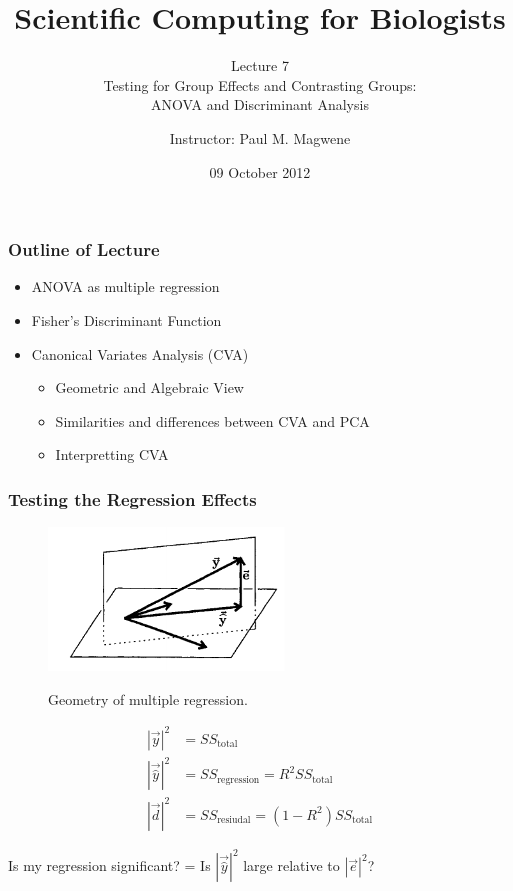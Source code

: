 \documentclass{beamer}
\title{Scientific Computing for Biologists}
\subtitle{Lecture 7 \\
        Testing for Group Effects and Contrasting Groups:\\ 
         ANOVA and Discriminant Analysis}
\author{Instructor: Paul M. Magwene}
\date{09 October 2012}
\begin{document}
\begin{frame}
\titlepage
\end{frame}


\begin{frame}
  \frametitle{Outline of Lecture}

\begin{itemize}
    \item ANOVA as multiple regression
    \item Fisher's Discriminant Function    
    \item Canonical Variates Analysis (CVA)
    \begin{itemize}
        \item Geometric and Algebraic View
        \item Similarities and differences between CVA and PCA
        \item Interpretting CVA
    \end{itemize}    

\end{itemize}

\end{frame}



\begin{frame}[fragile]
  \frametitle{Testing the Regression Effects}
  
\begin{figure}
{\centering \includegraphics[height=1.5in]{fig-multireg.pdf}}
\caption{Geometry of multiple regression.}
\end{figure}
%
\begin{align*}
|\vec{y}|^2 &= SS_{\text{total}} \\
|\vec{\hat{y}}|^2 &= SS_{\text{regression}} = R^2 SS_{\text{total}}\\
|\vec{d}|^2 &= SS_{\text{resiudal}}  = (1-R^2)SS_{\text{total}}
\end{align*}
%
\begin{center}
\alert{Is my regression significant? = Is $|\vec{\hat{y}}|^2$ large relative to $|\vec{e}|^2$?}
\end{center}

\end{frame}
\end{document}
